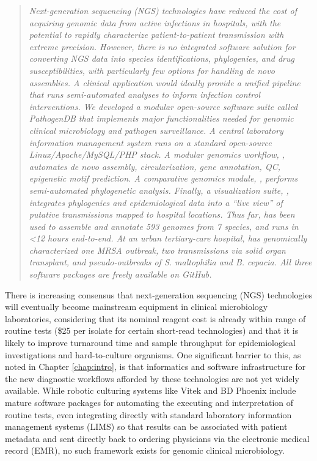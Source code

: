 \begin{quote}
\emph{Next-generation sequencing (NGS) technologies have reduced the cost of acquiring genomic data from active infections in hospitals, with the potential to rapidly characterize patient-to-patient transmission with extreme precision. However, there is no integrated software solution for converting NGS data into species identifications, phylogenies, and drug susceptibilities, with particularly few options for handling \emph{de novo} assemblies. A clinical application would ideally provide a unified pipeline that runs semi-automated analyses to inform infection control interventions. We developed a modular open-source software suite called PathogenDB that implements major functionalities needed for genomic clinical microbiology and pathogen surveillance. A central laboratory information management system runs on a standard open-source Linux/Apache/MySQL/PHP stack. A modular genomics workflow, \pathogendbpipeline, automates de novo assembly, circularization, gene annotation, QC, epigenetic motif prediction. A comparative genomics module, \pathogendbcomparison, performs semi-automated phylogenetic analysis. Finally, a visualization suite, \pathogendbviz, integrates phylogenies and epidemiological data into a ``live view'' of putative transmissions mapped to hospital locations. Thus far, \pathogendbpipeline{} has been used to assemble and annotate 593 genomes from 7 species, and runs in <12 hours end-to-end. At an urban tertiary-care hospital, \pathogendbcomparison{} has genomically characterized one MRSA outbreak, two transmissions via solid organ transplant, and pseudo-outbreaks of \emph{S. maltophilia} and \emph{B. cepacia}. All three software packages are freely available on GitHub.
}
\end{quote}

There is increasing consensus that next-generation sequencing (NGS) technologies will eventually become mainstream equipment in clinical microbiology laboratories, considering that its nominal reagent cost is already within range of routine tests (\$25 per isolate for certain short-read technologies) and that it is likely to improve turnaround time and sample throughput for epidemiological investigations and hard-to-culture organisms.\autocite{Didelot2012,Koser2012} One significant barrier to this, as noted in Chapter \ref{chap:intro}, is that informatics and software infrastructure for the new diagnostic workflows afforded by these technologies are not yet widely available. While robotic culturing systems like Vitek and BD Phoenix include mature software packages for automating the executing and interpretation of routine tests, even integrating directly with standard laboratory information management systems (LIMS) so that results can be associated with patient metadata and sent directly back to ordering physicians via the electronic medical record (EMR), no such framework exists for genomic clinical microbiology.

